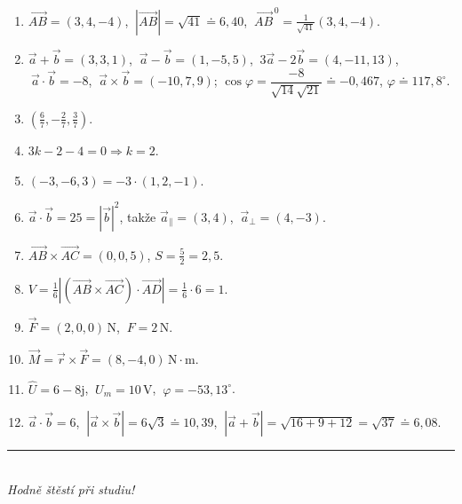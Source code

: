 \documentclass[a4paper,11pt]{article}
\newcommand{\abs}[1]{\left\lvert #1\right\rvert}
\newcommand{\jed}[1]{\,\mathrm{#1}}      %
\newcommand{\dc}{{,}}                    %
\newcommand{\jimag}{\mathrm{j}}          %
\begin{document}
\begin{enumerate}[label=\textbf{\arabic*.},leftmargin=*,itemsep=1pt]
  \item $\overrightarrow{AB}=(3,4,-4)$, $\ \abs{\overrightarrow{AB}}=\sqrt{41}\doteq6\dc40$,
        $\ \overrightarrow{AB}^{\,0}=\frac1{\sqrt{41}}(3,4,-4)$.
  \item $\vec a+\vec b=(3,3,1)$, $\ \vec a-\vec b=(1,-5,5)$, $\ 3\vec a-2\vec b=(4,-11,13)$,
        $\ \vec a\cdot\vec b=-8$, $\ \vec a\times\vec b=(-10,7,9)$;
        $\cos\varphi=\dfrac{-8}{\sqrt{14}\sqrt{21}}\doteq-0\dc467$, $\varphi\doteq117\dc8^\circ$.
  \item $\left(\tfrac67,-\tfrac27,\tfrac37\right)$.
  \item $3k-2-4=0\Rightarrow k=2$.
  \item $(-3,-6,3)=-3\cdot(1,2,-1)$.
  \item $\vec a\cdot\vec b=25=\abs{\vec b}^2$, takže $\vec a_\parallel=(3,4)$, $\ \vec a_\perp=(4,-3)$.
  \item $\overrightarrow{AB}\times\overrightarrow{AC}=(0,0,5)$, $S=\tfrac52=2\dc5$.
  \item $V=\tfrac16\abs{(\overrightarrow{AB}\times\overrightarrow{AC})\cdot\overrightarrow{AD}}=\tfrac16\cdot6=1$.
  \item $\vec F=(2,0,0)\jed{N}$, $\ F=2\jed{N}$.
  \item $\vec M=\vec r\times\vec F=(8,-4,0)\jed{N\cdot m}$.
  \item $\hat U=6-8\jimag$, $\ U_m=10\jed{V}$, $\ \varphi=-53\dc13^\circ$.
  \item $\vec a\cdot\vec b=6$, $\ \abs{\vec a\times\vec b}=6\sqrt3\doteq10\dc39$,
        $\ \abs{\vec a+\vec b}=\sqrt{16+9+12}=\sqrt{37}\doteq6\dc08$.
\end{enumerate}

\vspace{1.2cm}
\begin{center}
\color{primary}\rule{0.4\textwidth}{0.6pt}\\[4pt]
\small\itshape Hodně štěstí při studiu!
\end{center}
\end{document}
